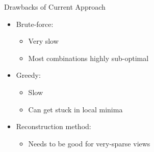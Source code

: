 \documentclass[english,aspectratio=43]{beamer}
\begin{document}
\begin{frame}{Drawbacks of Current Approach}
	\begin{itemize}
	\setlength\itemsep{2em}
	    \item Brute-force:
	        \begin{itemize}
	            \item Very slow
	            \item Most combinations highly sub-optimal
	        \end{itemize}
	    
	    \item Greedy:
	        \begin{itemize}
	            \item Slow
	            \item Can get stuck in local minima
	        \end{itemize}
	        
	    \item Reconstruction method:
            \begin{itemize}
                \item Needs to be good for very-sparse views
            \end{itemize}
	    
	\end{itemize}
\end{frame}

            
            
\end{document}
